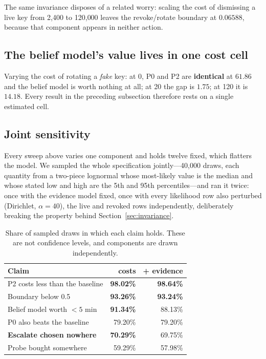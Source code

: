 \documentclass{article}
\begin{document}
The same invariance disposes of a related worry: scaling the cost of dismissing
a live key from 2{,}400 to 120{,}000 leaves the revoke/rotate boundary at
$0.06588$, because that component appears in neither action.

\subsection{The belief model's value lives in one cost cell}
\label{sec:onecell}

Varying the cost of rotating a \emph{fake} key: at 0, P0 and P2 are
\textbf{identical} at $61.86$ and the belief model is worth nothing at all; at
20 the gap is $1.75$; at 120 it is $14.18$. Every result in the preceding
subsection therefore rests on a single estimated cell.

\subsection{Joint sensitivity}
\label{sec:robustness}

Every sweep above varies one component and holds twelve fixed, which flatters
the model. We sampled the whole specification jointly---40{,}000 draws, each
quantity from a two-piece lognormal whose most-likely value is the median and
whose stated low and high are the 5th and 95th percentiles---and ran it twice:
once with the evidence model fixed, once with every likelihood row also
perturbed (Dirichlet, $\alpha = 40$), the live and revoked rows independently,
deliberately breaking the property behind Section~\ref{sec:invariance}.

\begin{table}[t]
\centering
\small
\begin{tabular}{lrr}
\toprule
\textbf{Claim} & \textbf{costs} & \textbf{+ evidence} \\
\midrule
P2 costs less than the baseline & \textbf{98.02\%} & \textbf{98.64\%} \\
Boundary below 0.5 & \textbf{93.26\%} & \textbf{93.24\%} \\
Belief model worth $<5$ min & \textbf{91.34\%} & 88.13\% \\
P0 also beats the baseline & 79.20\% & 79.20\% \\
\textbf{Escalate chosen nowhere} & \textbf{70.29\%} & 69.75\% \\
Probe bought somewhere & 59.29\% & 57.98\% \\
\bottomrule
\end{tabular}
\caption{Share of sampled draws in which each claim holds. These are not
confidence levels, and components are drawn independently.}
\label{tab:robust}
\end{table}
\end{document}
